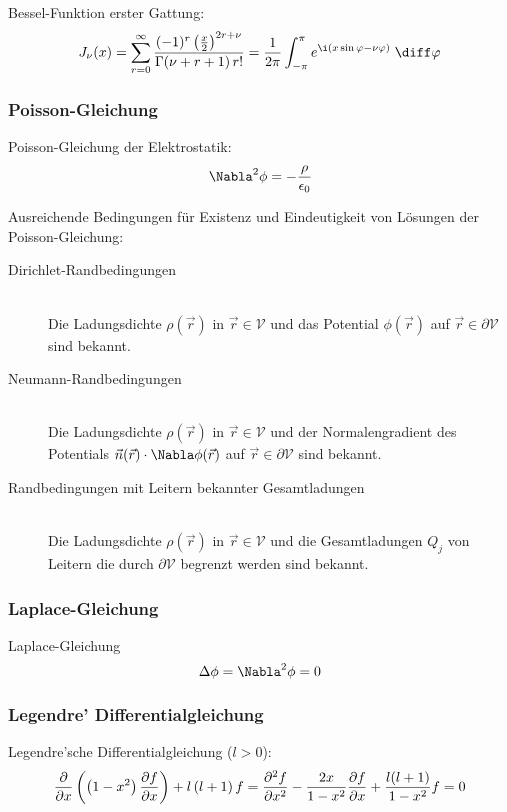 \documentclass[11pt]{article}
\numberwithin{equation}{section}
\begin{document}
        Bessel-Funktion erster Gattung:
        \begin{equation}
          J_\nu(x) = \sum_{r=0}^\infty \frac{(-1)^r\left(\frac{x}{2}\right)^{2r+\nu}}{\Gamma(\nu+r+1)\,r!} = \frac{1}{2\pi}\int_{-\pi}^{\pi} e^{\i(x\sin\varphi-\nu\varphi)}\;\diff\varphi
        \end{equation}

      \subsubsection{Poisson-Gleichung}
        Poisson-Gleichung der Elektrostatik:
        \begin{equation}
          \Nabla^2\phi = -\frac{\rho}{\epsilon_0}
        \end{equation}

        Ausreichende Bedingungen für Existenz und Eindeutigkeit von Lösungen der Poisson-Gleichung:
        \begin{description}
          \item[Dirichlet-Randbedingungen]\hfill \\
            Die Ladungsdichte $\rho(\vec{r})$ in $\vec{r}\in\mathcal{V}$ und das Potential $\phi(\vec{r})$ auf $\vec{r}\in\partial\mathcal{V}$ sind bekannt.
          \item[Neumann-Randbedingungen]\hfill \\
            Die Ladungsdichte $\rho(\vec{r})$ in $\vec{r}\in\mathcal{V}$ und der Normalengradient des Potentials $\vec{n}(\vec{r})\cdot\Nabla\phi(\vec{r})$ auf $\vec{r}\in\partial\mathcal{V}$ sind bekannt.
          \item[Randbedingungen mit Leitern bekannter Gesamtladungen]\hfill \\
            Die Ladungsdichte $\rho(\vec{r})$ in $\vec{r}\in\mathcal{V}$ und die Gesamtladungen $Q_j$ von Leitern die durch $\partial\mathcal{V}$ begrenzt werden sind bekannt.
        \end{description}

      \subsubsection{Laplace-Gleichung}
        Laplace-Gleichung
        \begin{equation}
          \Delta\phi=\Nabla^2\phi = 0
        \end{equation}

      \subsubsection{Legendre' Differentialgleichung}
        Legendre'sche Differentialgleichung ($l>0$):
        \begin{equation}
          \frac{\partial }{\partial x}\left(\left(1-x^2\right)\frac{\partial f}{\partial x}\right)+l\left(l+1\right)f
          = \frac{\partial^2 f}{\partial x^2} - \frac{2x}{1-x^2}\frac{\partial f}{\partial x} + \frac{l(l+1)}{1-x^2}f = 0
        \end{equation}
\end{document}
